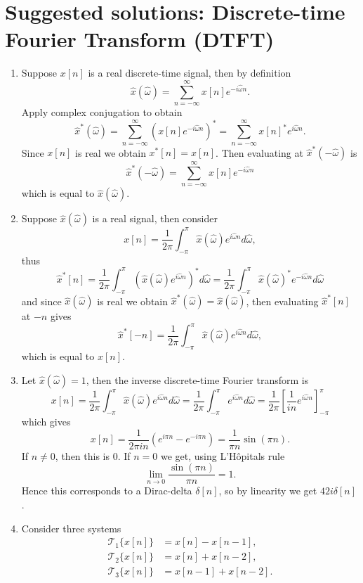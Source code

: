 \newpage
\section{Suggested solutions: Discrete-time Fourier Transform (DTFT)}
\begin{enumerate}
\item Suppose $x[n]$ is a real discrete-time signal, then by definition
$$\hat{x}(\hat{\omega})=\sum_{n=-\infty}^{\infty}x[n]e^{-i\hat{\omega}n}.$$
Apply complex conjugation to obtain
$$\hat{x}^{*}(\hat{\omega})=\sum_{n=-\infty}^{\infty}(x[n]e^{-i\hat{\omega}n})^{*}=\sum_{n=-\infty}^{\infty}x[n]^{*}e^{i\hat{\omega}n}.$$
Since $x[n]$ is real we obtain $x^{*}[n]=x[n]$. Then evaluating at $\hat{x}^{*}(-\hat{\omega})$ is
$$\hat{x}^{*}(-\hat{\omega})=\sum_{n=-\infty}^{\infty}x[n]e^{-i\hat{\omega}n}$$
which is equal to $\hat{x}(\hat{\omega})$. 

\item Suppose $\hat{x}(\hat{\omega})$ is a real signal, then consider
$$x[n]=\frac{1}{2\pi}\int_{-\pi}^{\pi}\hat{x}(\hat{\omega})e^{i\hat{\omega}n}d\hat{\omega},$$
thus
$$\hat{x}^{*}[n]=\frac{1}{2\pi}\int_{-\pi}^{\pi}(\hat{x}(\hat{\omega})e^{i\hat{\omega}n})^{*}d\hat{\omega}=\frac{1}{2\pi}\int_{-\pi}^{\pi}\hat{x}(\hat{\omega})^{*}e^{-i\hat{\omega}n}d\hat{\omega}$$
and since $\hat{x}(\hat{\omega})$ is real we obtain $\hat{x}^{*}(\hat{\omega})=\hat{x}(\hat{\omega})$, then evaluating $\hat{x}^{*}[n]$ at $-n$ gives
$$\hat{x}^{*}[-n]=\frac{1}{2\pi}\int_{-\pi}^{\pi}\hat{x}(\hat{\omega})e^{i\hat{\omega}n}d\hat{\omega},$$
which is equal to $x[n]$. 

\item Let $\hat{x}(\hat{\omega})=1$, then the inverse discrete-time Fourier transform is
$$x[n]=\frac{1}{2\pi}\int_{-\pi}^{\pi}\hat{x}(\hat{\omega})e^{i\hat{\omega}n}d\hat{\omega}=\frac{1}{2\pi}\int_{-\pi}^{\pi}e^{i\hat{\omega}n}d\hat{\omega}=\frac{1}{2\pi}\left[\frac{1}{in}e^{i\hat{\omega}n}\right]_{-\pi}^{\pi}$$
which gives
$$x[n]=\frac{1}{2\pi in}(e^{i\pi n}-e^{-i\pi n})=\frac{1}{\pi n}\sin(\pi n).$$
If $n\neq 0$, then this is $0$. If $n=0$ we get, using L'Hôpitals rule
$$\lim_{n\to 0}\frac{\sin(\pi n)}{\pi n}=1.$$
Hence this corresponds to a Dirac-delta $\delta[n]$, so by linearity we get $42i\delta[n]$. 

\item Consider three systems
\begin{align*}
    \mathcal{T}_{1}\{x[n]\}&=x[n]-x[n-1], \\
    \mathcal{T}_{2}\{x[n]\}&=x[n]+x[n-2], \\
    \mathcal{T}_{3}\{x[n]\}&=x[n-1]+x[n-2].
\end{align*}


\end{enumerate}
